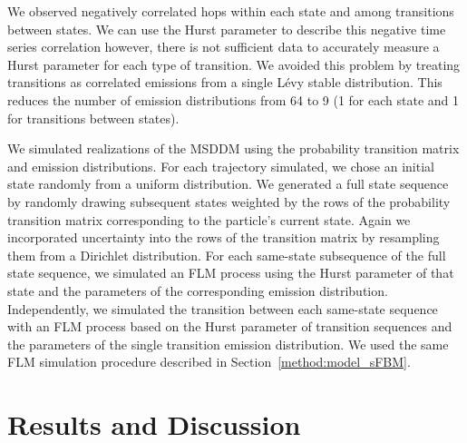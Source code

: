\documentclass{article}
\begin{document}
  We observed negatively correlated hops within each state and among transitions between
  states. We can use the Hurst parameter to describe this negative time series correlation
  however, there is not sufficient data to accurately measure a Hurst parameter for 
  each type of transition. We avoided this problem by treating transitions as correlated
  emissions from a single L\'evy stable distribution. This reduces the number of emission
  distributions from 64 to 9 (1 for each state and 1 for transitions between states).
  
  We simulated realizations of the MSDDM using the probability transition matrix and 
  emission distributions. For each trajectory simulated, we chose an initial state
  randomly from a uniform distribution. We generated a full state sequence by randomly
  drawing subsequent states weighted by the rows of the probability transition matrix
  corresponding to the particle's current state. 
  Again we incorporated uncertainty into
  the rows of the transition matrix by resampling them from a Dirichlet distribution. 
  For each same-state subsequence of the full state sequence, we simulated an FLM process
  using the Hurst parameter of that state and the parameters of the corresponding emission
  distribution. Independently, we simulated the transition between each same-state 
  sequence with an FLM process based on the Hurst parameter of transition sequences and 
  the parameters of the single transition emission distribution. We used the same FLM 
  simulation procedure described in Section~\ref{method:model_sFBM}.

  

  \section{Results and Discussion}
  
\end{document}
